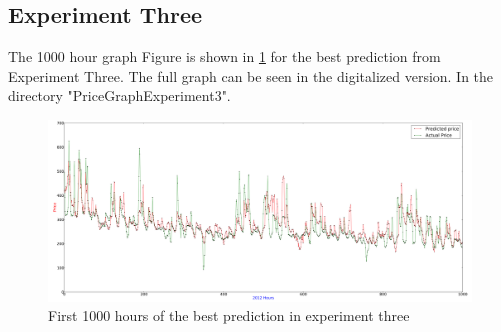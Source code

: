 \subsection{Experiment Three}
The 1000 hour graph Figure is shown in \ref{fig:fullPageExperiment3} for the best prediction from Experiment Three. The full graph can be seen in the digitalized version. In the directory "PriceGraphExperiment3".

\begin{figure}
\centering
\includegraphics[width=\linewidth]{billeder/PriceGraphs/Experiment3.png}
\caption{First 1000 hours of the best prediction in experiment three}
\label{fig:fullPageExperiment3}
\end{figure}

